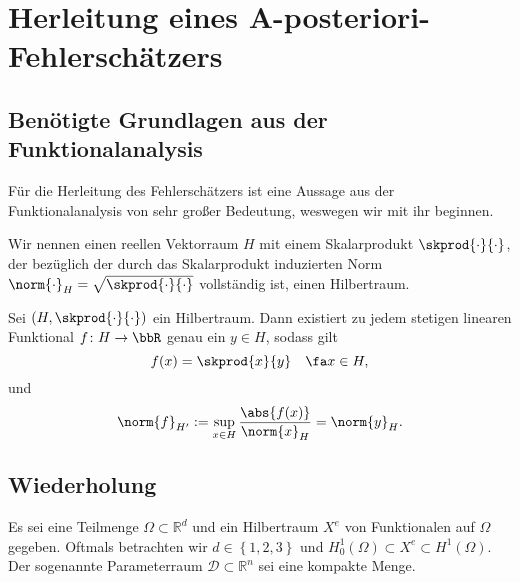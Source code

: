 
\section{Herleitung eines A-posteriori-Fehlerschätzers} %
\label{sec:herleitung}


\subsection{Benötigte Grundlagen aus der Funktionalanalysis} %
\label{sub:ben_tigte_grundlagen_aus_der_funktionalanalysis}

Für die Herleitung des Fehlerschätzers ist eine Aussage aus der Funktionalanalysis von sehr großer Bedeutung, weswegen wir mit ihr beginnen.

\begin{Definition}[Hilbertraum]
    \label{def:hilbertraum}
    Wir nennen einen reellen Vektorraum $H$ mit einem Skalarprodukt $\skprod{\cdot}{\cdot}$, der bezüglich der durch das Skalarprodukt induzierten Norm $\norm{\cdot}_H = \sqrt{\skprod{\cdot}{\cdot}}$ vollständig ist, einen Hilbertraum.
\end{Definition}

\begin{Satz}
    \label{satz:rieszscher_darstellungssatz}
    Sei $(H, \skprod{\cdot}{\cdot})$ ein Hilbertraum. Dann existiert zu jedem stetigen linearen Funktional $f \colon H \to \bbR$ genau ein $y \in H$, sodass gilt
    \begin{equation}
        f(x) = \skprod{x}{y} \quad \fa x \in H,
    \end{equation}
    und
    \begin{equation}
         \norm{f}_{H'} := \sup_{x \in H} \frac{\abs{f(x)}}{\norm{x}_H} = \norm{y}_H.
    \end{equation}
\end{Satz}

\subsection{Wiederholung} %
\label{sub:wiederholung}

Es sei eine Teilmenge $\Omega \subset \mathbb{R}^d$ und ein Hilbertraum $X^e$ von Funktionalen auf $\Omega$ gegeben.
Oftmals betrachten wir $d \in \left\{ 1, 2, 3 \right\}$ und $H^1_0(\Omega) \subset X^e \subset H^1(\Omega)$.
Der sogenannte Parameterraum $\mathcal D \subset \mathbb{R}^n$ sei eine kompakte Menge.

